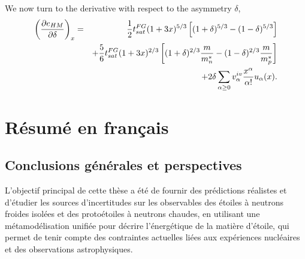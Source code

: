 %
We now turn to the derivative with respect to the asymmetry $\delta$,
%
\begin{eqnarray}
  \left(\frac{\partial e_{HM}}{\partial \delta}\right)_x &=&
  \frac{1}{2}t_{sat}^{FG}(1+3x)^{5/3}\left[(1+\delta)^{5/3} 
  - (1-\delta)^{5/3}\right]\notag\\
                                                         &&+ 
  \frac{5}{6}t_{sat}^{FG}(1+3x)^{2/3}\left[(1+\delta)^{2/3}\frac{m}{m_n^*} -
  (1-\delta)^{2/3}\frac{m}{m_p^*}\right]\notag\\
                                                         &&+
  2\delta \sum_{\alpha \geq 0}v_\alpha^{iv}\frac{x^\alpha}{\alpha!}u_\alpha(x).
\end{eqnarray}
%

\chapter{Résumé en français}\label{appendix:fr_part}

\section{Conclusions générales et perspectives}

L'objectif principal de cette thèse a été de fournir des prédictions réalistes 
et d'étudier les sources d'incertitudes sur les observables des étoiles à 
neutrons froides isolées et des protoétoiles à neutrons chaudes, en utilisant 
une métamodélisation unifiée pour décrire l'énergétique de la matière d'étoile, 
qui permet de tenir compte des contraintes actuelles liées aux expériences 
nucléaires et des observations astrophysiques.
\\

